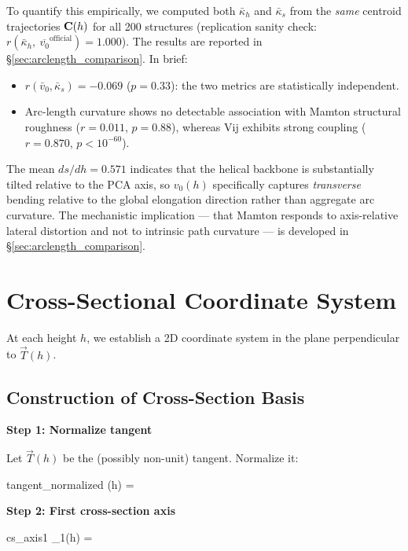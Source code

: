 To quantify this empirically, we computed both $\bar{\kappa}_h$ and $\bar{\kappa}_s$ from the \emph{same} centroid trajectories $\mathbf{C}(h)$ for all 200 structures (replication sanity check: $r(\bar{\kappa}_h,\ \overline{v_0}^{\mathrm{official}}) = 1.000$). The results are reported in \S\ref{sec:arclength_comparison}. In brief:
\begin{itemize}
    \item $r(\bar{v}_0, \bar{\kappa}_s) = -0.069$ ($p = 0.33$): the two metrics are statistically independent.
    \item Arc-length curvature shows no detectable association with Mamton structural roughness ($r = 0.011$, $p = 0.88$), whereas Vij exhibits strong coupling ($r = 0.870$, $p < 10^{-60}$).
\end{itemize}
The mean $ds/dh = 0.571$ indicates that the helical backbone is substantially tilted relative to the PCA axis, so $v_0(h)$ specifically captures \emph{transverse} bending relative to the global elongation direction rather than aggregate arc curvature. The mechanistic implication --- that Mamton responds to axis-relative lateral distortion and not to intrinsic path curvature --- is developed in \S\ref{sec:arclength_comparison}.

\section{Cross-Sectional Coordinate System}

At each height $h$, we establish a 2D coordinate system in the plane perpendicular to $\vec{T}(h)$.

\subsection{Construction of Cross-Section Basis}

\textbf{Step 1: Normalize tangent}

Let $\vec{T}(h)$ be the (possibly non-unit) tangent. Normalize it:

\begin{beq}{tangent_normalized}
    (h) = 
\end{beq}

\textbf{Step 2: First cross-section axis}

\begin{beq}{cs_axis1}
    _1(h) = 
\end{beq}

